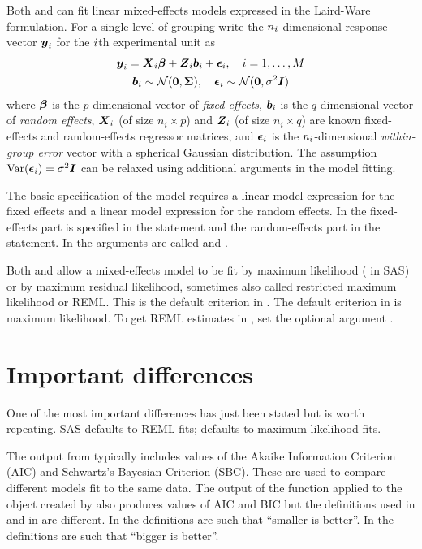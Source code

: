 \documentclass[]{article}
\begin{document}
Both  and  can fit linear mixed-effects
models expressed in the Laird-Ware formulation.  For a single level of
grouping  write the $n_i\/$-dimensional
response vector ${{\boldsymbol {y}}}_i$ for the $i\/$th experimental unit as
\begin{gather}
  \label{eqn:oneLevel}
  {{\boldsymbol {y}}}_i = {{\boldsymbol {X}}}_i {\boldsymbol {\beta}} + {{\boldsymbol {Z}}}_i {{\boldsymbol {b}}}_i + {\boldsymbol {\epsilon}}_i,\quad i=1,\dots,M\\
  {{\boldsymbol {b}}}_i\sim{\cal N}({{\boldsymbol {0}}},{\boldsymbol {\Sigma}}),
  \quad{\boldsymbol {\epsilon}}_i\sim{\cal N}({{\boldsymbol {0}}},\sigma^2 {{\boldsymbol {I}}})\notag
\end{gather}
where ${\boldsymbol {\beta}}$ is the $p$-dimensional vector of \emph{fixed effects},
${{\boldsymbol {b}}}_i$ is the $q$-dimensional vector of \emph{random effects},
${{\boldsymbol {X}}}_i$ (of size $n_i\times p$) and ${{\boldsymbol {Z}}}_i$ (of size $n_i\times q$)
are known fixed-effects and random-effects regressor matrices, and
${\boldsymbol {\epsilon}}_i$ is the $n_i\/$-dimensional \emph{within-group error} vector
with a spherical Gaussian distribution.  The assumption
$\mathrm{Var}({\boldsymbol {\epsilon}}_i)=\sigma^2{{\boldsymbol {I}}}$ can be relaxed using additional
arguments in the model fitting.

The basic specification of the model requires a linear model
expression for the fixed effects and a linear model expression for the 
random effects.  In  the fixed-effects part is
specified in the  statement and the random-effects
part in the  statement.  In  the
arguments are called  and .

Both  and  allow a mixed-effects model to
be fit by maximum likelihood ( in SAS) or by maximum
residual likelihood, sometimes also called restricted maximum
likelihood or \textsf{REML}.  This is the default criterion in .  The default criterion in  is maximum
likelihood.  To get \textsf{REML} estimates in , set the
optional argument .


\section{Important differences}
\label{sec:differences}

One of the most important differences has just been stated but is
worth repeating.  SAS defaults to \textsf{REML} fits; 
defaults to maximum likelihood fits.

The output from  typically includes values of the
Akaike Information Criterion (\textsf{AIC}) and Schwartz's Bayesian
Criterion (\textsf{SBC}).  These are used to compare different models
fit to the same data.  The output of the  function applied
to the object created by  also produces values of \textsf{AIC}
and \textsf{BIC} but the definitions used in  and in
 are different.  In  the definitions are such that
``smaller is better''.  In  the definitions are such
that ``bigger is better''.
\end{document}
